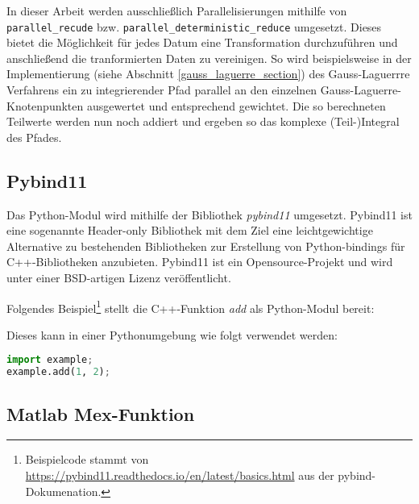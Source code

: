 \begin{center}
    
\end{center}

In dieser Arbeit werden ausschließlich Parallelisierungen mithilfe von \linebreak \texttt{parallel\_recude} bzw. \texttt{parallel\_deterministic\_reduce} umgesetzt.
Dieses bietet die Möglichkeit für jedes Datum eine Transformation durchzuführen und anschließend die tranformierten Daten zu vereinigen. 
So wird beispielsweise in der Implementierung (siehe Abschnitt \ref{gauss_laguerre_section}) des Gauss-Laguerrre Verfahrens ein zu integrierender Pfad parallel an den einzelnen Gauss-Laguerre-Knotenpunkten ausgewertet und entsprechend gewichtet.
Die so berechneten Teilwerte werden nun noch addiert und ergeben so das komplexe (Teil-)Integral des Pfades. 

\subsection{Pybind11}

Das Python-Modul wird mithilfe der Bibliothek \textit{pybind11} umgesetzt.
Pybind11 ist eine sogenannte Header-only Bibliothek mit dem Ziel eine leichtgewichtige Alternative zu bestehenden Bibliotheken zur Erstellung  von
Python-bindings für C++-Bibliotheken anzubieten.
Pybind11\cite{pybind} ist ein Opensource-Projekt und wird unter einer BSD-artigen Lizenz veröffentlicht. 

Folgendes Beispiel\footnote{Beispielcode stammt von \url{https://pybind11.readthedocs.io/en/latest/basics.html} aus der pybind-Dokumenation\cite{pybind}.} stellt die C++-Funktion \textit{add} als Python-Modul bereit:
\begin{center}

\end{center}
Dieses kann in einer Pythonumgebung wie folgt verwendet werden:

\begin{center}
\begin{lstlisting}[language=Python]
import example;
example.add(1, 2);
\end{lstlisting}
\end{center}



\subsection{Matlab Mex-Funktion}

